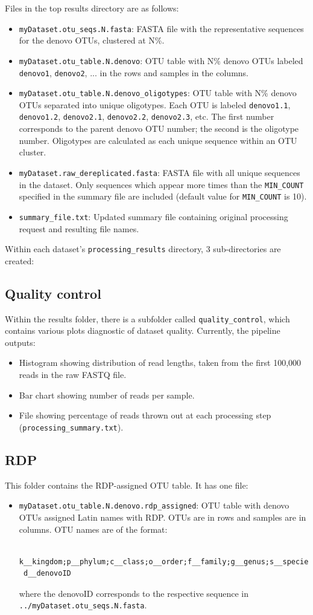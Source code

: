 \documentclass[11pt, oneside]{article}   	%
\begin{document}
Files in the top results directory are as follows:
\begin{itemize}
	\item {\tt myDataset.otu\_seqs.N.fasta}: FASTA file with the representative sequences for the denovo OTUs, clustered at N\%.
	\item {\tt myDataset.otu\_table.N.denovo}: OTU table with N\% denovo OTUs labeled {\tt denovo1}, {\tt denovo2}, ... in the rows and samples in the columns.
	\item {\tt myDataset.otu\_table.N.denovo\_oligotypes}: OTU table with N\% denovo OTUs separated into unique oligotypes. Each OTU is labeled {\tt denovo1.1}, {\tt denovo1.2}, {\tt denovo2.1}, {\tt denovo2.2}, {\tt denovo2.3}, etc. The first number corresponds to the parent denovo OTU number; the second is the oligotype number. Oligotypes are calculated as each unique sequence within an OTU cluster.
	\item {\tt myDataset.raw\_dereplicated.fasta}: FASTA file with all unique sequences in the dataset. Only sequences which appear more times than the {\tt MIN\_COUNT} specified in the summary file are included (default value for {\tt MIN\_COUNT} is 10).
	\item {\tt summary\_file.txt}: Updated summary file containing original processing request and resulting file names.
\end{itemize}

Within each dataset's {\tt processing\_results} directory, 3 sub-directories are created:
\subsection{Quality control}
Within the results folder, there is a subfolder called {\tt quality\_control}, which contains various plots diagnostic of dataset quality.  Currently, the pipeline outputs:
\begin{itemize}
	\item Histogram showing distribution of read lengths, taken from the first 100,000 reads in the raw FASTQ file.
	\item Bar chart showing number of reads per sample.
	\item File showing percentage of reads thrown out at each processing step 
	({\tt processing\_summary.txt}).
\end{itemize}

\subsection{RDP}
This folder contains the RDP-assigned OTU table. It has one file:
\begin{itemize}
	\item {\tt myDataset.otu\_table.N.denovo.rdp\_assigned}: OTU table with denovo OTUs assigned Latin names with RDP. OTUs are in rows and samples are in columns. OTU names are of the format: \begin{verbatim}
 k__kingdom;p__phylum;c__class;o__order;f__family;g__genus;s__species;
 d__denovoID
\end{verbatim} where the denovoID corresponds to the respective sequence in {\tt ../myDataset.otu\_seqs.N.fasta}.
\end{itemize}
\end{document}
